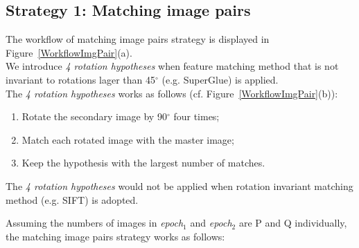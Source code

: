 \subsection{Strategy 1: Matching image pairs}
The workflow of matching image pairs strategy is displayed in Figure~\ref{WorkflowImgPair}(a).\\
We introduce \textit{4 rotation hypotheses} when feature matching method that is not invariant to rotations lager than 45$^\circ$ (e.g. SuperGlue) is applied.\\
The \textit{4 rotation hypotheses} works as follows (cf. Figure~\ref{WorkflowImgPair}(b)): 
\begin{enumerate}
    \item Rotate the secondary image by 90$^{\circ}$ four times;
    \item Match each rotated image with the master image;
    \item Keep the hypothesis with the largest number of matches.
\end{enumerate}
The \textit{4 rotation hypotheses} would not be applied when rotation invariant matching method (e.g. SIFT) is adopted.
\par
Assuming the numbers of images in \textit{epoch$_1$} and \textit{epoch$_2$} are P and Q individually, the matching image pairs strategy works as follows:\\
